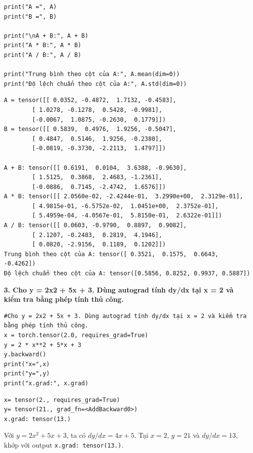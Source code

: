 \documentclass[12pt,a4paper]{article}
\begin{document}
\begin{itemize}
\begin{verbatim}
print("A =", A)
print("B =", B)

print("\nA + B:", A + B)
print("A * B:", A * B)
print("A / B:", A / B)

print("Trung bình theo cột của A:", A.mean(dim=0))
print("Độ lệch chuẩn theo cột của A:", A.std(dim=0))
\end{verbatim}

\begin{verbatim}
A = tensor([[ 0.0352, -0.4872,  1.7132, -0.4583],
        [ 1.0278, -0.1278,  0.5428, -0.9981],
        [-0.0067,  1.0875, -0.2630,  0.1779]])
B = tensor([[ 0.5839,  0.4976,  1.9256, -0.5047],
        [ 0.4847,  0.5146,  1.9256, -0.2380],
        [-0.0819, -0.3730, -2.2113,  1.4797]])

A + B: tensor([[ 0.6191,  0.0104,  3.6388, -0.9630],
        [ 1.5125,  0.3868,  2.4683, -1.2361],
        [-0.0886,  0.7145, -2.4742,  1.6576]])
A * B: tensor([[ 2.0560e-02, -2.4244e-01,  3.2990e+00,  2.3129e-01],
        [ 4.9815e-01, -6.5752e-02,  1.0451e+00,  2.3752e-01],
        [ 5.4959e-04, -4.0567e-01,  5.8150e-01,  2.6322e-01]])
A / B: tensor([[ 0.0603, -0.9790,  0.8897,  0.9082],
        [ 2.1207, -0.2483,  0.2819,  4.1946],
        [ 0.0820, -2.9156,  0.1189,  0.1202]])
Trung bình theo cột của A: tensor([ 0.3521,  0.1575,  0.6643, -0.4262])
Độ lệch chuẩn theo cột của A: tensor([0.5856, 0.8252, 0.9937, 0.5887])
\end{verbatim}

\textbf{3. Cho y = 2x2 + 5x + 3. Dùng autograd tính dy/dx tại x = 2 và kiểm tra bằng phép tính thủ công.}

\begin{verbatim}
#Cho y = 2x2 + 5x + 3. Dùng autograd tính dy/dx tại x = 2 và kiểm tra bằng phép tính thủ công.
x = torch.tensor(2.0, requires_grad=True)
y = 2 * x**2 + 5*x + 3
y.backward()
print("x=",x)
print("y=",y)
print("x.grad:", x.grad)
\end{verbatim}

\begin{verbatim}
x= tensor(2., requires_grad=True)
y= tensor(21., grad_fn=<AddBackward0>)
x.grad: tensor(13.)
\end{verbatim}

Với $y=2x^2+5x+3$, ta có $dy/dx=4x+5$. Tại $x=2$, $y=21$ và $dy/dx=13$, khớp với output \texttt{x.grad: tensor(13.)}.


\end{itemize}
\end{document}
